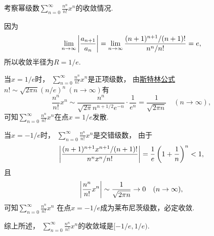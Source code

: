 \begin{example}
考察幂级数\(\sum_{n=0}^\infty \frac{n^n}{n!} x^n\)的收敛情况.
\begin{solution}
因为\[
	\lim_{n\to\infty} \abs{\frac{a_{n+1}}{a_n}}
	= \lim_{n\to\infty} \frac{(n+1)^{n+1} / (n+1)!}{n^n / n!}
	= e,
\]
所以收敛半径为\(R=1/e\).

当\(x=1/e\)时，
\(\sum_{n=0}^\infty \frac{n^n}{n!} x^n\)是正项级数，
由\hyperref[example:无穷乘积.斯特林公式]{斯特林公式}
\(n! \sim \sqrt{2\pi n} (n/e)^n\ (n\to\infty)\)有\[
	\frac{n^n}{n!} x^n
	\sim
	\frac{n^n}{\sqrt{2\pi} n^{n+1/2} e^{-n}} \cdot \frac1{e^n}
	= \frac1{\sqrt{2\pi n}}
	\quad(n\to\infty),
\]
可知\(\sum_{n=0}^\infty \frac{n^n}{n!} x^n\)在点\(x=1/e\)发散.

当\(x=-1/e\)时，
\(\sum_{n=0}^\infty \frac{n^n}{n!} x^n\)是交错级数，
由于\[
	\abs{\frac{(n+1)^{n+1} x^{n+1} / (n+1)!}{n^n x^n / n!}}
	= \frac1e \left( 1 + \frac1n \right)^n
	< 1,
\]
且\[
	\abs{\frac{n^n}{n!} x^n}
	\sim
	\frac1{\sqrt{2\pi n}}
	\to 0
	\quad(n\to\infty),
\]
可知\(\sum_{n=0}^\infty \frac{n^n}{n!} x^n\)
在点\(x=-1/e\)成为莱布尼茨级数，必定收敛.

综上所述，
\(\sum_{n=0}^\infty \frac{n^n}{n!} x^n\)的收敛域是\([-1/e,1/e)\).
\end{solution}
\end{example}

